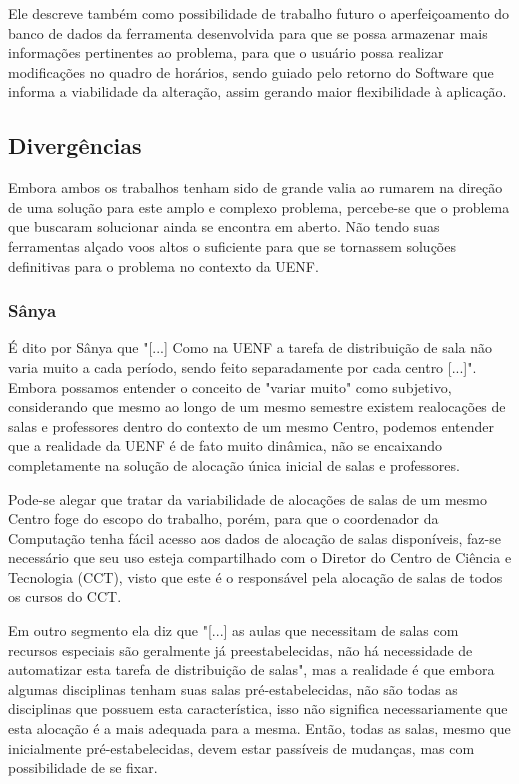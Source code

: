         Ele descreve também como possibilidade de trabalho futuro o aperfeiçoamento do banco de dados da ferramenta desenvolvida para que se possa armazenar mais informações pertinentes ao problema, para que o usuário possa realizar modificações no quadro de horários, sendo guiado pelo retorno do Software que informa a viabilidade da alteração, assim gerando maior flexibilidade à aplicação.

    \subsection{Divergências} %

        Embora ambos os trabalhos tenham sido de grande valia ao rumarem na direção de uma solução para este amplo e complexo problema, percebe-se que o problema que buscaram solucionar ainda se encontra em aberto. Não tendo suas ferramentas alçado voos altos o suficiente para que se tornassem soluções definitivas para o problema no contexto da UENF.

        \subsubsection{Sânya} %

            É dito por Sânya que "[...] Como na UENF a tarefa de distribuição de sala não varia muito a cada período, sendo feito separadamente por cada centro [...]". Embora possamos entender o conceito de "variar muito" como subjetivo, considerando que mesmo ao longo de um mesmo semestre existem realocações de salas e professores dentro do contexto de um mesmo Centro, podemos entender que a realidade da UENF é de fato muito dinâmica, não se encaixando completamente na solução de alocação única inicial de salas e professores.

            Pode-se alegar que tratar da variabilidade de alocações de salas de um mesmo Centro foge do escopo do trabalho, porém, para que o coordenador da Computação tenha fácil acesso aos dados de alocação de salas disponíveis, faz-se necessário que seu uso esteja compartilhado com o Diretor do Centro de Ciência e Tecnologia (CCT), visto que este é o responsável pela alocação de salas de todos os cursos do CCT.

            Em outro segmento ela diz que "[...] as aulas que necessitam de salas com recursos especiais são geralmente já preestabelecidas, não há necessidade de automatizar esta tarefa de distribuição de salas", mas a realidade é que embora algumas disciplinas tenham suas salas pré-estabelecidas, não são todas as disciplinas que possuem esta característica, isso não significa necessariamente que esta alocação é a mais adequada para a mesma. Então, todas as salas, mesmo que inicialmente pré-estabelecidas, devem estar passíveis de mudanças, mas com possibilidade de se fixar.

